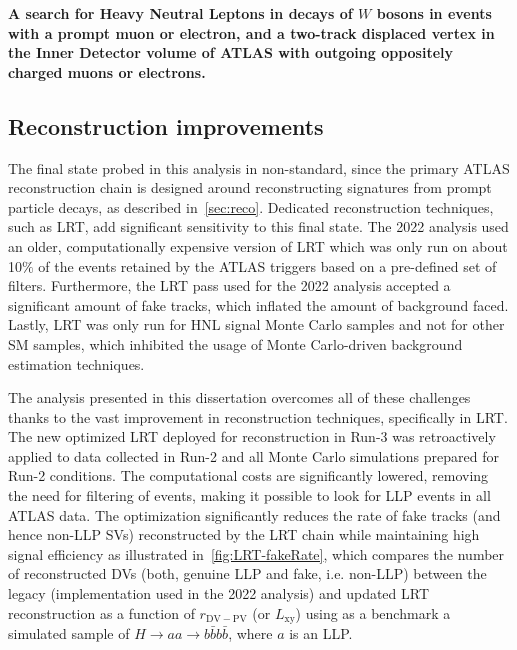 \textbf{A search for Heavy Neutral Leptons in decays of $W$ bosons in events with a prompt muon or electron, and a two-track displaced vertex in the Inner Detector volume of ATLAS with outgoing oppositely charged muons or electrons.}

\subsection{Reconstruction improvements}
The final state probed in this analysis in non-standard, since the primary ATLAS reconstruction chain is designed around reconstructing signatures from prompt particle decays, as described in~\cref{sec:reco}. Dedicated reconstruction techniques, such as LRT, add significant sensitivity to this final state. The 2022 analysis used an older, computationally expensive version of LRT which was only run on about 10$\%$ of the events retained by the ATLAS triggers based on a pre-defined set of filters. Furthermore, the LRT pass used for the 2022 analysis accepted a significant amount of fake tracks, which inflated the amount of background faced. Lastly, LRT was only run for HNL signal Monte Carlo samples and not for other SM samples, which inhibited the usage of Monte Carlo-driven background estimation techniques. 

The analysis presented in this dissertation overcomes all of these challenges thanks to the vast improvement in reconstruction techniques, specifically in LRT. The new optimized LRT deployed for reconstruction in Run-3 was retroactively applied to data collected in Run-2 and all Monte Carlo simulations prepared for Run-2 conditions. The computational costs are significantly lowered, removing the need for filtering of events, making it possible to look for LLP events in all ATLAS data. The optimization significantly reduces the rate of fake tracks (and hence non-LLP SVs) reconstructed by the LRT chain while maintaining high signal efficiency as illustrated in~\cref{fig:LRT-fakeRate}, which compares the number of reconstructed DVs (both, genuine LLP and fake, i.e. non-LLP) between the legacy (implementation used in the 2022 analysis) and updated LRT reconstruction as a function of $r_\mathrm{DV-PV}$ (or $L_\mathrm{xy}$) using as a benchmark a simulated sample of $H\rightarrow aa \rightarrow b\bar{b}b\bar{b}$, where $a$ is an LLP.

